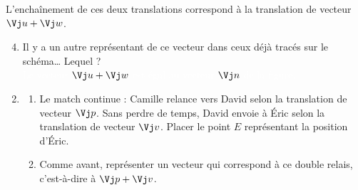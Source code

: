 \documentclass[a4paper,11pt,french]{report}
\begin{document}
\begin{center}
\end{center}

\begin{JauneBox}
L'enchaînement de ces deux translations correspond à la translation de vecteur $\Vj u+\Vj w$.
\end{JauneBox}

\begin{enumerate}
\setcounter{enumi}{3}
\item[d)] Il y a un autre représentant de ce vecteur dans ceux déjà tracés sur le schéma\dots{} Lequel ?\\
\textcolor{white}{Le vecteur $\Vj u+\Vj w$ est égal au vecteur $\Vj n$ de la figure.}
\end{enumerate}

\begin{enumerate}
\setcounter{enumi}{1}
\item
\begin{enumerate}
\item Le match continue : Camille relance vers David selon la translation de vecteur $\Vj p$. Sans perdre de temps, David envoie à Éric selon la translation de vecteur $\Vj v$. Placer le point $E$ représentant la position d'Éric.
\item Comme avant, représenter un vecteur qui correspond à ce double relais, c'est-à-dire à $\Vj p+\Vj v$.
\end{enumerate}
\end{enumerate}
\end{document}
